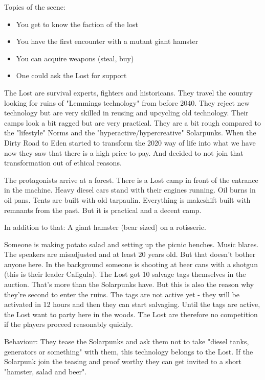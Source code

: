 Topics of the scene:

\begin{itemize}
\item You get to know the faction of the lost
\item You have the first encounter with a mutant giant hamster
\item You can acquire weapons (steal, buy)
\item One could ask the Lost for support
\end{itemize}

\begin{sidebarBox}[title=The Lost]
The Lost are survival experts, fighters and historicans. They travel the country looking for ruins of "Lemmings technology" from before 2040. They reject new technology but are very skilled in reusing and upcycling old technology. Their camps look a bit ragged but are very practical. They are a bit rough compared to the "lifestyle" Norms and the "hyperactive/hypercreative" Solarpunks. When the Dirty Road to Eden started to transform the 2020 way of life into what we have now they saw that there is a high price to pay. And decided to not join that transformation out of ethical reasons.
\end{sidebarBox}

The protagonists arrive at a forest. There is a Lost camp in front of the entrance in the machine. Heavy diesel cars stand with their engines running. Oil burns in oil pans. Tents are built with old tarpaulin. Everything is makeshift built with remnants from the past. But it is practical and a decent camp.

In addition to that: A giant hamster (bear sized) on a rotisserie.

Someone is making potato salad and setting up the picnic benches. Music blares.
The speakers are misadjusted and at least 20 years old. But that doesn't bother anyone here. In the background someone is shooting at beer cans with a shotgun (this is their leader Caligula). 
The Lost got 10 salvage tags themselves in the auction. That's more than the Solarpunks have. But this is also the reason why they're second to enter the ruins. The tags are not active yet - they will be activated in 12 hours and then they can start salvaging. Until the tags are active, the Lost want to party
here in the woods. The Lost are therefore no competition if the players proceed reasonably quickly.

Behaviour: They tease the Solarpunks and ask them not to take "diesel tanks, generators or something" with
them, this technology belongs to the Lost. If the Solarpunk join the teasing and proof worthy they can get invited to a short "hamster, salad and beer".

